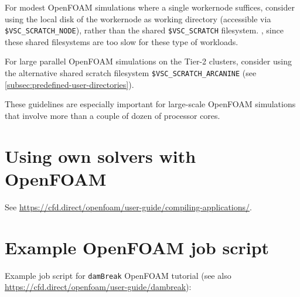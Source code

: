 For modest OpenFOAM simulations where a single workernode suffices, consider using the local disk of the
workernode as working directory (accessible via \lstinline|$VSC_SCRATCH_NODE|),
rather than the shared \lstinline|$VSC_SCRATCH| filesystem. , since these shared filesystems are too slow for these type of workloads.

\ifgent
For large parallel OpenFOAM simulations on the \university Tier-2 clusters, consider using the
alternative shared scratch filesystem \lstinline|$VSC_SCRATCH_ARCANINE| (see \autoref{subsec:predefined-user-directories}).
\fi

These guidelines are especially important for large-scale OpenFOAM simulations that involve
more than a couple of dozen of processor cores.


\section{Using own solvers with OpenFOAM}
\label{sec:best-practices-openfoam-own-solvers-libraries}

See \url{https://cfd.direct/openfoam/user-guide/compiling-applications/}.

\section{Example OpenFOAM job script}
\label{sec:best-practices-openfoam-example-script}

Example job script for \lstinline|damBreak| OpenFOAM tutorial
(see also \url{https://cfd.direct/openfoam/user-guide/dambreak}):

